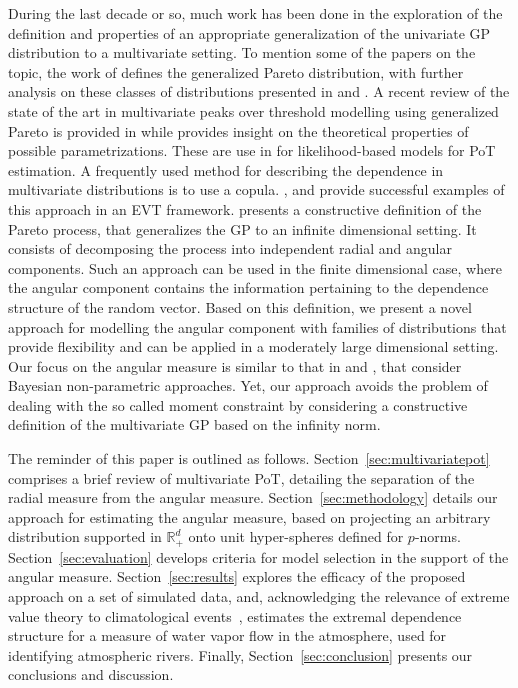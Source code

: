 During the last decade or so, much work has been done in the exploration of the definition 
  and properties of an appropriate generalization of the univariate GP distribution 
  to a multivariate setting.  To mention some of the papers on the topic, the work of
  \citep{rootzen2006} defines the generalized Pareto distribution, with further analysis on these classes
  of distributions presented in \cite{falk2008} and \cite{michel2008}.  A recent review of the state
  of the art in multivariate peaks over threshold modelling using generalized Pareto is provided in
  \cite{rootzen2018} while \cite{RoSeWa2018a} provides insight on the theoretical properties of possible parametrizations. These are use in \cite{KiRoSeWa2019} for likelihood-based models for PoT estimation.
  A frequently used method for describing the dependence
  in multivariate distributions is to use a copula. \cite{renard2007}, and \cite{falk2019} provide successful examples of this approach in an EVT framework. \cite{ferreira2014} presents a constructive definition of the Pareto process, that generalizes the GP to an infinite dimensional setting. It consists of decomposing the process into independent radial and angular components. Such an approach can be used in the finite dimensional case, where the angular component 
  contains the information pertaining to the dependence structure of the random vector.
  Based on this definition, we present a novel approach for modelling  the angular component
  with families of distributions that provide flexibility and can be applied in a moderately large dimensional setting.
  Our focus on the  angular measure is similar to that in \cite{SaNa2014} and \cite{HaCaCh2017}, that consider Bayesian non-parametric approaches. Yet, our approach avoids the problem of dealing with the so called moment constraint by considering a constructive definition of the multivariate GP based on the infinity norm.
  
  The reminder of this paper is outlined as follows. Section~\ref{sec:multivariatepot} comprises a brief review of multivariate PoT, detailing the separation of the radial measure from the angular measure.
  Section~\ref{sec:methodology} details our approach for estimating the angular measure, based on projecting an arbitrary distribution supported in ${\mathbb R}_+^d$ onto unit hyper-spheres defined for $p$-norms. Section~\ref{sec:evaluation} develops criteria for model selection in the support of the angular measure.  Section~\ref{sec:results} explores the efficacy of the proposed approach on a set of simulated data, and, acknowledging the relevance of extreme value theory to climatological events~\citep{jentsch2007,vousdoukas2018,li2019}, estimates the extremal dependence structure for a measure of water vapor flow in the atmosphere, used for identifying atmospheric rivers.  Finally, Section~\ref{sec:conclusion} presents our conclusions and discussion.

